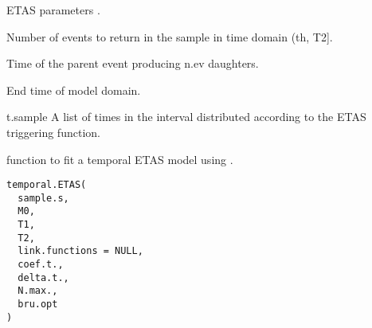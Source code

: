 \documentclass[letterpaper]{book}
\begin{document}
%
\begin{Arguments}
\begin{ldescription}
\item[\code{theta}] ETAS parameters .

\item[\code{n.ev}] Number of events to return in the sample in time domain (th, T2].

\item[\code{th}] Time of the parent event producing n.ev daughters.

\item[\code{T2}] End time of model domain.
\end{ldescription}
\end{Arguments}
%
\begin{Value}
t.sample A list of times in the interval  distributed according to the ETAS triggering function.
\end{Value}
%
\begin{Description}\relax
function to fit a temporal ETAS model using .
\end{Description}
%
\begin{Usage}
\begin{verbatim}
temporal.ETAS(
  sample.s,
  M0,
  T1,
  T2,
  link.functions = NULL,
  coef.t.,
  delta.t.,
  N.max.,
  bru.opt
)
\end{verbatim}
\end{Usage}
%
\end{document}
